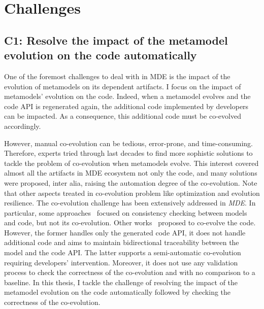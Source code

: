 \section{Challenges}
\label{challenges}
\subsection*{C1: Resolve the impact of the metamodel evolution on the code automatically}
\label{C1}
One of the foremost challenges to deal with in MDE is the impact of the evolution of metamodels on its dependent artifacts. I focus on the impact of metamodels' evolution on the code. 
Indeed, when a metamodel evolves and the code API is regenerated again, the additional code implemented by developers can be impacted.
	As a consequence, this additional code must be co-evolved accordingly.%

However, manual co-evolution can be tedious, error-prone, and time-consuming. %
Therefore, experts tried through last decades to find more sophistic solutions to tackle the problem of co-evolution when metamodels evolve. This interest covered almost all the artifacts in MDE ecosystem not only the code, and many solutions were proposed, inter alia, raising the automation degree of the co-evolution. Note that other aspects treated in co-evolution problem like optimization and evolution resilience.
The co-evolution challenge has been extensively addressed in \emph{MDE}. 
In particular, some approaches~\cite{riedl2014towards,kanakis2019empirical,pham2017bidirectional,jongeling2020towards,jongeling2022Structural,zaheri2021towards} focused on consistency checking between models and code, but not its co-evolution.
Other works~\cite{yu2012maintaining,Khelladi2020} proposed to co-evolve the code. However, the former handles only the generated code API, it does not handle additional code and aims to maintain bidirectional traceability between the model and the code API. The latter supports a semi-automatic co-evolution requiring developers' intervention. Moreover, it does not use any validation process to check the correctness of the co-evolution and with no comparison to a baseline. In this thesis, I tackle the challenge of resolving the impact of the metamodel evolution on the code automatically followed by checking the correctness of the co-evolution.

